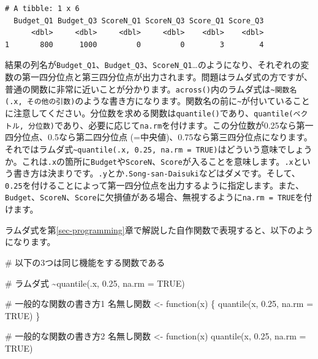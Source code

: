 \documentclass[
  a4paper,
  pandoc,
  ja=standard,
  jafont=haranoaji]{bxjsbook}
\newenvironment{Shaded}{\begin{snugshade}}{\end{snugshade}}
\newcommand{\AttributeTok}[1]{\textcolor[rgb]{0.00,0.48,0.65}{#1}}
\newcommand{\CommentTok}[1]{\textcolor[rgb]{0.37,0.37,0.37}{#1}}
\newcommand{\ConstantTok}[1]{\textcolor[rgb]{0.56,0.35,0.01}{#1}}
\newcommand{\ControlFlowTok}[1]{\textcolor[rgb]{0.00,0.48,0.65}{#1}}
\newcommand{\FloatTok}[1]{\textcolor[rgb]{0.68,0.00,0.00}{#1}}
\newcommand{\FunctionTok}[1]{\textcolor[rgb]{0.28,0.35,0.67}{#1}}
\newcommand{\NormalTok}[1]{\textcolor[rgb]{0.00,0.48,0.65}{#1}}
\newcommand{\OtherTok}[1]{\textcolor[rgb]{0.00,0.48,0.65}{#1}}
\newcommand{\SpecialCharTok}[1]{\textcolor[rgb]{0.37,0.37,0.37}{#1}}
\begin{document}
\begin{verbatim}
# A tibble: 1 x 6
  Budget_Q1 Budget_Q3 ScoreN_Q1 ScoreN_Q3 Score_Q1 Score_Q3
      <dbl>     <dbl>     <dbl>     <dbl>    <dbl>    <dbl>
1       800      1000         0         0        3        4
\end{verbatim}

結果の列名が\texttt{Budget\_Q1}、\texttt{Budget\_Q3}、\texttt{ScoreN\_Q1}\ldots のようになり、それぞれの変数の第一四分位点と第三四分位点が出力されます。問題はラムダ式の方ですが、普通の関数に非常に近いことが分かります。\texttt{across()}内のラムダ式は\texttt{\textasciitilde{}関数名(.x,\ その他の引数)}のような書き方になります。関数名の前に\texttt{\textasciitilde{}}が付いていることに注意してください。分位数を求める関数は\texttt{quantile()}であり、\texttt{quantile(ベクトル,\ 分位数)}であり、必要に応じて\texttt{na.rm}を付けます。この分位数が0.25なら第一四分位点、0.5なら第二四分位点
(=中央値)、0.75なら第三四分位点になります。それではラムダ式\texttt{\textasciitilde{}quantile(.x,\ 0.25,\ na.rm\ =\ TRUE)}はどういう意味でしょうか。これは\texttt{.x}の箇所に\texttt{Budget}や\texttt{ScoreN}、\texttt{Score}が入ることを意味します。\texttt{.x}という書き方は決まりです。\texttt{.y}とか\texttt{.Song-san-Daisuki}などはダメです。そして、\texttt{0.25}を付けることによって第一四分位点を出力するように指定します。また、\texttt{Budget}、\texttt{ScoreN}、\texttt{Score}に欠損値がある場合、無視するように\texttt{na.rm\ =\ TRUE}を付けます。

ラムダ式を第\ref{sec-programming}章で解説した自作関数で表現すると、以下のようになります。

\begin{Shaded}
\begin{Highlighting}[numbers=left,,]
\CommentTok{\# 以下の3つは同じ機能をする関数である}

\CommentTok{\# ラムダ式}
\SpecialCharTok{\textasciitilde{}}\FunctionTok{quantile}\NormalTok{(.x, }\FloatTok{0.25}\NormalTok{, }\AttributeTok{na.rm =} \ConstantTok{TRUE}\NormalTok{)}

\CommentTok{\# 一般的な関数の書き方1}
\NormalTok{名無し関数 }\OtherTok{\textless{}{-}} \ControlFlowTok{function}\NormalTok{(x) \{}
  \FunctionTok{quantile}\NormalTok{(x, }\FloatTok{0.25}\NormalTok{, }\AttributeTok{na.rm =} \ConstantTok{TRUE}\NormalTok{)}
\NormalTok{\}}

\CommentTok{\# 一般的な関数の書き方2}
\NormalTok{名無し関数 }\OtherTok{\textless{}{-}} \ControlFlowTok{function}\NormalTok{(x) }\FunctionTok{quantile}\NormalTok{(x, }\FloatTok{0.25}\NormalTok{, }\AttributeTok{na.rm =} \ConstantTok{TRUE}\NormalTok{)}
\end{Highlighting}
\end{Shaded}
\end{document}

